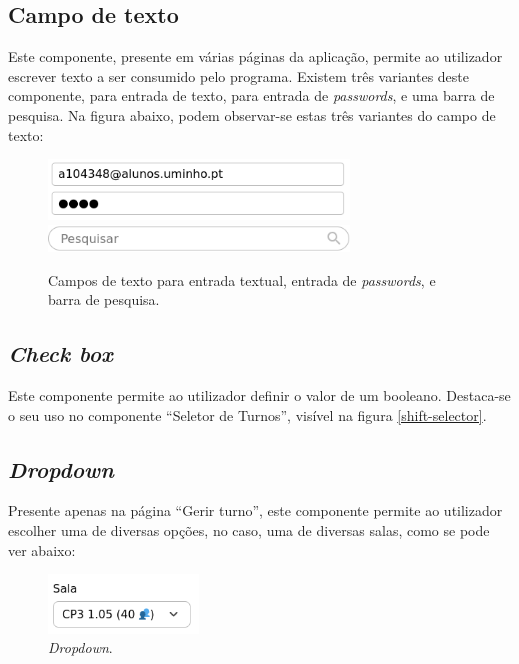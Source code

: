 \documentclass[12pt, a4paper]{article}
\begin{document}
\subsection{Campo de texto}

Este componente, presente em várias páginas da aplicação, permite ao utilizador escrever texto a ser
consumido pelo programa. Existem três variantes deste componente, para entrada de texto, para
entrada de \emph{passwords}, e uma barra de pesquisa. Na figura abaixo, podem observar-se estas três
variantes do campo de texto:

\begin{figure}[H]
    \centering
    \includegraphics[width=8cm]{res/components/text-input-regular-password.png} \\
    \includegraphics[width=8cm]{res/components/text-input-search.png}
    \caption{
        Campos de texto para entrada textual, entrada de \emph{passwords}, e barra de pesquisa.
    }
    \label{text-input}
\end{figure}

\subsection{\emph{Check box}}

Este componente permite ao utilizador definir o valor de um booleano. Destaca-se o seu uso no
componente ``Seletor de Turnos'', visível na figura \ref{shift-selector}.

\subsection{\emph{Dropdown}}

Presente apenas na página ``Gerir turno'', este componente permite ao utilizador escolher uma de
diversas opções, no caso, uma de diversas salas, como se pode ver abaixo:

\begin{figure}[H]
    \centering
    \includegraphics[width=4cm]{res/components/dropdown.png}
    \caption{\emph{Dropdown}.}
    \label{dropdown}
\end{figure}
\end{document}
